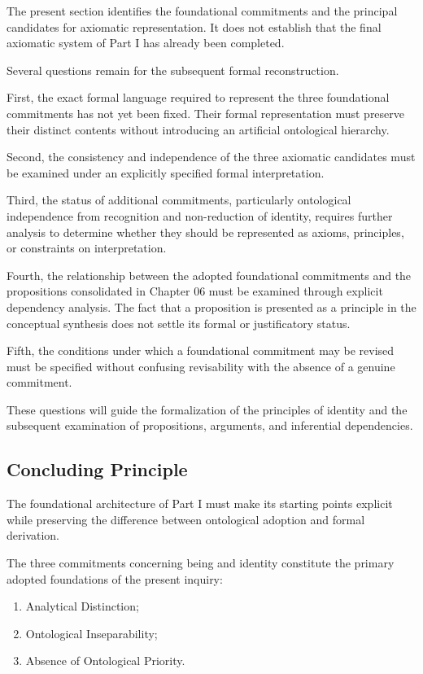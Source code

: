 The present section identifies
the foundational commitments and
the principal candidates for
axiomatic representation. It
does not establish that the final
axiomatic system of Part I has
already been completed.

Several questions remain for
the subsequent formal reconstruction.

First, the exact formal language
required to represent the three
foundational commitments has
not yet been fixed. Their formal
representation must preserve
their distinct contents without
introducing an artificial
ontological hierarchy.

Second, the consistency and
independence of the three
axiomatic candidates must be
examined under an explicitly
specified formal interpretation.

Third, the status of additional
commitments, particularly
ontological independence from
recognition and non-reduction
of identity, requires further
analysis to determine whether
they should be represented
as axioms, principles, or
constraints on interpretation.

Fourth, the relationship between
the adopted foundational
commitments and the propositions
consolidated in Chapter 06
must be examined through
explicit dependency analysis.
The fact that a proposition
is presented as a principle
in the conceptual synthesis
does not settle its formal
or justificatory status.

Fifth, the conditions under
which a foundational commitment
may be revised must be specified
without confusing revisability
with the absence of a genuine
commitment.

These questions will guide
the formalization of the
principles of identity and
the subsequent examination
of propositions, arguments,
and inferential dependencies.

\subsection{Concluding Principle}

The foundational architecture
of Part I must make its
starting points explicit
while preserving the difference
between ontological adoption
and formal derivation.

The three commitments concerning
being and identity constitute
the primary adopted foundations
of the present inquiry:

\begin{enumerate}
    \item Analytical Distinction;
    \item Ontological Inseparability;
    \item Absence of Ontological Priority.
\end{enumerate}

